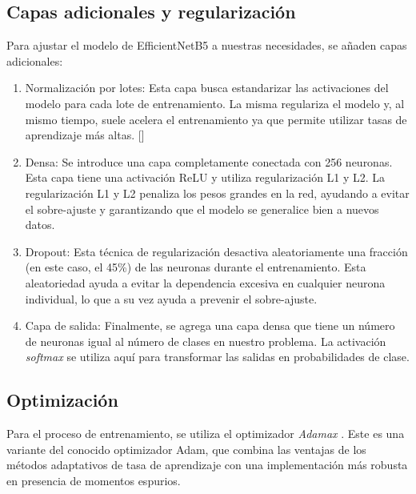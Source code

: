 \subsection{Capas adicionales y regularización}

Para ajustar el modelo de EfficientNetB5 a nuestras necesidades, se añaden capas adicionales:

\begin{enumerate}
   \item Normalización por lotes: Esta capa busca estandarizar las activaciones del modelo para cada lote de entrenamiento. 
   La misma regulariza el modelo y, al mismo tiempo, suele acelera el entrenamiento ya que permite utilizar tasas de aprendizaje más altas. []

   \item Densa: Se introduce una capa completamente conectada con 256 neuronas. Esta capa tiene una activación ReLU y utiliza regularización L1 y L2.
   La regularización L1 y L2 penaliza los pesos grandes en la red, ayudando a evitar el sobre-ajuste y garantizando que el modelo se generalice
    bien a nuevos datos. 
   
   \item Dropout: Esta técnica de regularización desactiva aleatoriamente una fracción (en este caso, el 45\%) de las neuronas durante el 
   entrenamiento. Esta aleatoriedad ayuda a evitar la dependencia excesiva en cualquier neurona individual, lo que a su vez ayuda a prevenir
    el sobre-ajuste. 
   
   \item Capa de salida: Finalmente, se agrega una capa densa que tiene un número de neuronas igual al número de clases en nuestro problema. 
   La activación \textit{softmax} se utiliza aquí para transformar las salidas en probabilidades de clase.

\end{enumerate}

\subsection{Optimización}

Para el proceso de entrenamiento, se utiliza el optimizador \textit{Adamax} . Este es una variante del conocido optimizador Adam, que combina las ventajas de los métodos adaptativos de tasa de aprendizaje con una implementación más robusta en presencia de momentos espurios. 

